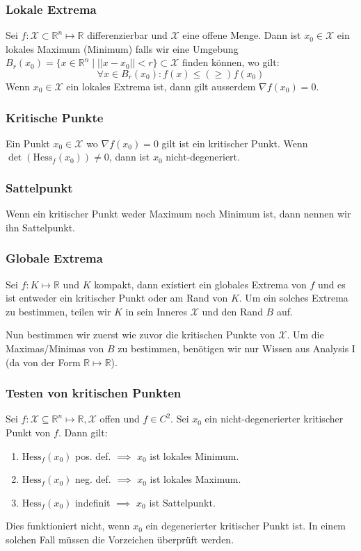 \documentclass[a4paper,10pt]{article}
\def\R{\mathbb{R}}
\def\X{\mathcal{X}}
\begin{document}
\subsubsection*{Lokale Extrema}
Sei \(f: \X \subset \R^n \mapsto \R\) differenzierbar und \(\X\) eine offene Menge. Dann ist \(x_0 \in \X\) ein lokales Maximum (Minimum) falls wir eine Umgebung \(B_r(x_0) = \{x\in \R^n \mid ||x-x_0|| < r \} \subset \X\) finden können, wo gilt:
\[\forall x \in B_r(x_0): f(x) \le (\ge) f(x_0)\]
Wenn \(x_0 \in \X\) ein lokales Extrema ist, dann gilt ausserdem \(\nabla f(x_0) = 0\).

\subsubsection*{Kritische Punkte}
Ein Punkt \(x_0 \in \X\) wo \(\nabla f(x_0) = 0\) gilt ist ein kritischer Punkt. Wenn \(\det(\text{Hess}_f(x_0)) \ne 0\), dann ist \(x_0\) nicht-degeneriert.

\subsubsection*{Sattelpunkt}
Wenn ein kritischer Punkt weder Maximum noch Minimum ist, dann nennen wir ihn Sattelpunkt.

\subsubsection*{Globale Extrema}
Sei \(f: K \mapsto \R\) und \(K\) kompakt, dann existiert ein globales Extrema von \(f\) und es ist entweder ein kritischer Punkt oder am Rand von \(K\). Um ein solches Extrema zu bestimmen, teilen wir \(K\) in sein Inneres \(\X\) und den Rand \(B\) auf. 

Nun bestimmen wir zuerst wie zuvor die kritischen Punkte von \(\X\). Um die Maximas/Minimas von \(B\) zu bestimmen, benötigen wir nur Wissen aus Analysis I (da von der Form \(\R \mapsto \R\)).
\subsubsection*{Testen von kritischen Punkten}
Sei \(f: \X \subseteq \R^n \mapsto \R, \X\) offen und \(f\in C^2\). Sei \(x_0\) ein nicht-degenerierter kritischer Punkt von \(f\). Dann gilt:
\begin{enumerate}
  \item $\text{Hess}_f(x_0)$ pos. def. \(\implies\) $x_0$ ist lokales Minimum.
  \item $\text{Hess}_f(x_0)$ neg. def. \(\implies\) $x_0$ ist lokales Maximum.
  \item $\text{Hess}_f(x_0)$ indefinit \(\implies\) $x_0$ ist Sattelpunkt.
\end{enumerate}
Dies funktioniert nicht, wenn \(x_0\) ein degenerierter kritischer Punkt ist. In einem solchen Fall müssen die Vorzeichen überprüft werden.
\end{document}
